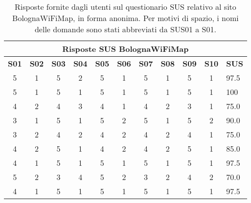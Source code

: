 \begin{center}
    \begin{table}[h]
        \centering
        \begin{tabularx}{\textwidth}{|c|c|c|c|c|c|c|c|c|c|X|}
            \hline
            \multicolumn{11}{|c|}{\textbf{Risposte SUS BolognaWiFiMap}} \\
            \hline
            \textbf{S01} & \textbf{S02} & \textbf{S03} & \textbf{S04} & \textbf{S05} & \textbf{S06} & \textbf{S07} & \textbf{S08} & \textbf{S09} & \textbf{S10} & \textbf{SUS} \\
            \hline
            5 & 1 & 5 & 2 & 5 & 1 & 5 & 1 & 5 & 1 & 97.5 \\
            5 & 1 & 5 & 1 & 5 & 1 & 5 & 1 & 5 & 1 & 100 \\
            4 & 2 & 4 & 3 & 4 & 1 & 4 & 2 & 3 & 1 & 75.0 \\
            3 & 1 & 5 & 1 & 5 & 2 & 5 & 1 & 5 & 2 & 90.0 \\
            3 & 2 & 4 & 2 & 4 & 2 & 4 & 2 & 4 & 1 & 75.0 \\
            4 & 2 & 5 & 1 & 4 & 2 & 4 & 2 & 5 & 1 & 85.0 \\
            4 & 1 & 5 & 1 & 5 & 1 & 5 & 1 & 5 & 1 & 97.5 \\
            5 & 2 & 3 & 4 & 5 & 2 & 3 & 2 & 4 & 2 & 70.0 \\
            4 & 1 & 5 & 1 & 5 & 1 & 5 & 1 & 5 & 1 & 97.5 \\
            \hline
        \end{tabularx}
        \caption[Risposte del questionario SUS sul sito BolognaWiFiMap]{Risposte fornite dagli utenti sul questionario SUS relativo al sito BolognaWiFiMap, in forma anonima. Per motivi di spazio, i nomi delle domande sono stati abbreviati da SUS01 a S01.}
        \label{tab:sus_bolognawifimap}
    \end{table}
\end{center}

